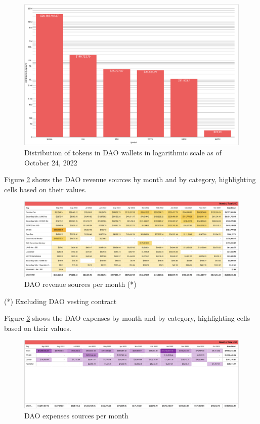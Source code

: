 \documentclass[MSE,Master,english]{twbook}%
\begin{document}
\begin{figure}[H]
  \centering
  \includegraphics[width=\textwidth]{metrics/token_distribution_log.png}
  \caption{Distribution of tokens in DAO wallets in logarithmic scale as of October 24, 2022}
  \label{fig:token_distribution_log}
\end{figure}

Figure \ref{fig:income} shows the DAO revenue sources by month and by category, highlighting cells based on their values.
\begin{figure}[H]
  \centering
  \includegraphics[width=\textwidth]{metrics/income.png}
  \caption{DAO revenue sources per month (*)}
  \label{fig:income}
\end{figure}
(*) Excluding DAO vesting contract\cite{DAOVesting}

Figure \ref{fig:expenses} shows the DAO expenses by month and by category, highlighting cells based on their values.
\begin{figure}[H]
  \centering
  \includegraphics[width=\textwidth]{metrics/expenses.png}
  \caption{DAO expenses sources per month}
  \label{fig:expenses}
\end{figure}
\end{document}
